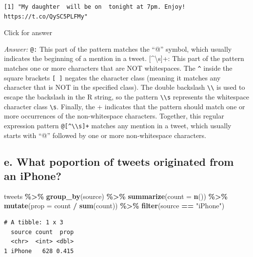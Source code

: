 \documentclass[
]{book}
\newenvironment{Shaded}{\begin{snugshade}}{\end{snugshade}}
\newcommand{\AttributeTok}[1]{\textcolor[rgb]{0.13,0.29,0.53}{#1}}
\newcommand{\FunctionTok}[1]{\textcolor[rgb]{0.13,0.29,0.53}{\textbf{#1}}}
\newcommand{\NormalTok}[1]{#1}
\newcommand{\SpecialCharTok}[1]{\textcolor[rgb]{0.81,0.36,0.00}{\textbf{#1}}}
\newcommand{\StringTok}[1]{\textcolor[rgb]{0.31,0.60,0.02}{#1}}
\begin{document}
\begin{verbatim}
[1] "My daughter  will be on  tonight at 7pm. Enjoy! https://t.co/QySC5PLFMy"
\end{verbatim}

Click for answer

\emph{Answer:} \texttt{@:} This part of the pattern matches the ``@'' symbol, which usually indicates the beginning of a mention in a tweet.
{[}\^{}\textbackslash s{]}+: This part of the pattern matches one or more characters that are NOT whitespaces. The \texttt{\^{}} inside the square brackets \texttt{{[}\ {]}} negates the character class (meaning it matches any character that is NOT in the specified class). The double backslash \texttt{\textbackslash{}\textbackslash{}} is used to escape the backslash in the R string, so the pattern \texttt{\textbackslash{}\textbackslash{}s} represents the whitespace character class \texttt{\textbackslash{}s}. Finally, the + indicates that the pattern should match one or more occurrences of the non-whitespace characters. Together, this regular expression pattern \texttt{@{[}\^{}\textbackslash{}\textbackslash{}s{]}+} matches any mention in a tweet, which usually starts with ``@'' followed by one or more non-whitespace characters.

\hypertarget{e.-what-poportion-of-tweets-originated-from-an-iphone}{%
\subsection{e. What poportion of tweets originated from an iPhone?}\label{e.-what-poportion-of-tweets-originated-from-an-iphone}}

\begin{Shaded}
\begin{Highlighting}[]
\NormalTok{tweets }\SpecialCharTok{\%\textgreater{}\%} \FunctionTok{group\_by}\NormalTok{(source) }\SpecialCharTok{\%\textgreater{}\%} \FunctionTok{summarize}\NormalTok{(}\AttributeTok{count =} \FunctionTok{n}\NormalTok{()) }\SpecialCharTok{\%\textgreater{}\%}
  \FunctionTok{mutate}\NormalTok{(}\AttributeTok{prop =}\NormalTok{ count }\SpecialCharTok{/} \FunctionTok{sum}\NormalTok{(count)) }\SpecialCharTok{\%\textgreater{}\%}  \FunctionTok{filter}\NormalTok{(source }\SpecialCharTok{==} \StringTok{"iPhone"}\NormalTok{)}
\end{Highlighting}
\end{Shaded}

\begin{verbatim}
# A tibble: 1 x 3
  source count  prop
  <chr>  <int> <dbl>
1 iPhone   628 0.415
\end{verbatim}
\end{document}
